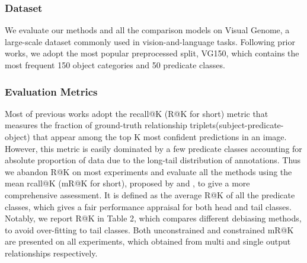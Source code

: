 \documentclass[sigconf]{acmart}
\begin{document}
\subsubsection{Dataset}
We evaluate our methods and all the comparison models on Visual Genome\cite{krishna17}, a large-scale dataset commonly used in vision-and-language tasks. Following prior works\cite{xu17,zellers18,chen19,tang19}, we adopt the most popular preprocessed split, VG150\cite{xu17}, which contains the most frequent 150 object categories and 50 predicate classes.
\subsubsection{Evaluation Metrics}
Most of previous works adopt the recall@K (R@K for short) metric that measures the fraction of ground-truth relationship triplets(subject-predicate-object) that appear among the top K most confident predictions in an image\cite{xu17}. However, this metric is easily dominated by a few predicate classes accounting for absolute proportion of data due to the long-tail distribution of annotations. Thus we abandon R@K on most experiments and evaluate all the methods using the mean rcall@K (mR@K for short), proposed by \citet{chen19} and \citet{tang19}, to give a more comprehensive assessment. It is defined as the average R@K of all the predicate classes, which gives a fair performance appraisal for both head and tail classes. Notably, we report R@K in Table 2, which compares different debiasing methods, to avoid over-fitting to tail classes.
Both unconstrained and constrained \cite{zellers18} mR@K are presented on all experiments, which obtained from multi and single output relationships respectively.
\end{document}
